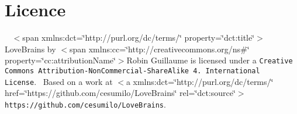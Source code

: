 \section*{Licence}

{\tt }~\newline
$<$span xmlns\+:dct=\char`\"{}http\+://purl.\+org/dc/terms/\char`\"{} property=\char`\"{}dct\+:title\char`\"{}$>$Love\+Brains by $<$span xmlns\+:cc=\char`\"{}http\+://creativecommons.\+org/ns\#\char`\"{} property=\char`\"{}cc\+:attribution\+Name\char`\"{}$>$Robin Guillaume is licensed under a {\tt Creative Commons Attribution-\/\+Non\+Commercial-\/\+Share\+Alike 4. International License}.~\newline
Based on a work at $<$a xmlns\+:dct=\char`\"{}http\+://purl.\+org/dc/terms/\char`\"{} href=\char`\"{}https\+://github.\+com/cesumilo/\+Love\+Brains\char`\"{} rel=\char`\"{}dct\+:source\char`\"{}$>${\tt https\+://github.\+com/cesumilo/\+Love\+Brains}. 